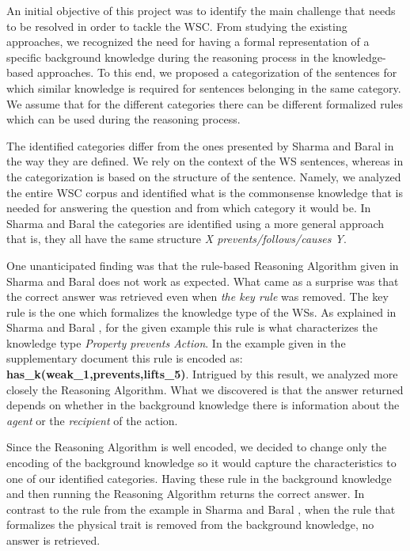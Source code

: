 An initial objective of this project was to identify the main challenge that needs to be resolved in order to tackle the WSC.
From studying the existing approaches, we recognized the need for having a formal representation of a specific background knowledge during the reasoning process in the knowledge-based approaches. To this end, we proposed a categorization of the sentences for which similar knowledge is required for sentences belonging in the same category. We assume that for the different categories there can be different formalized rules which can be used during the reasoning process. 


The identified categories differ from the ones presented by Sharma and Baral \cite{2018CommonsenseKT} in the way they are defined. We rely on the context of the WS sentences, whereas in \cite{2018CommonsenseKT} the categorization is based on the structure of the sentence. Namely, we analyzed the entire WSC corpus and identified what is the commonsense knowledge that is needed for answering the question and from which category it would be. In Sharma and Baral \cite{2018CommonsenseKT} the categories are identified using a more general approach that is, they all have the same structure \textit{X prevents/follows/causes Y}. 

One unanticipated finding was that the rule-based Reasoning Algorithm given in Sharma and Baral \cite{2018CommonsenseKT} does not work as expected.  What came as a surprise was that the correct answer was retrieved even when \textit{the key rule} was removed. The key rule is the one which formalizes the knowledge type of the WSs.
As explained in Sharma and Baral \cite{2018CommonsenseKT}, for the given example this rule is what characterizes the knowledge type \textit{Property prevents Action}. In the example given in the supplementary document this rule is encoded as: \textbf{has\_k(weak\_1,prevents,lifts\_5)}. 
Intrigued by this result, we analyzed more closely the Reasoning Algorithm. What we discovered is that the answer returned depends on whether in the background knowledge there is information about the \textit{agent} or the \textit{recipient} of the action. 

Since the Reasoning Algorithm is well encoded, we decided to change only the encoding of the background knowledge so it would capture the characteristics to one of our identified categories. 
Having these rule in the background knowledge and then running the Reasoning Algorithm returns the correct answer. In contrast to the rule from the example in Sharma and Baral \cite{2018CommonsenseKT}, when the rule that formalizes the physical trait is removed from the background knowledge, no answer is retrieved. 

